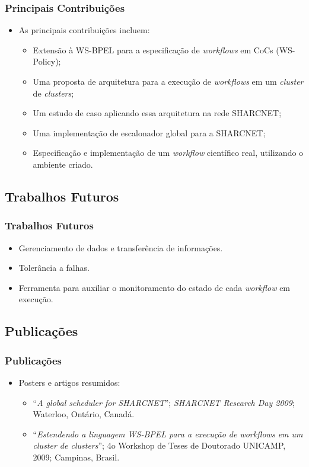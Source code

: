 \documentclass[red, cover=invisible, theme=Warsaw]{myslides}
\begin{document}
    
    \begin{frame} \frametitle{Principais Contribuições}
	\begin{itemize}
	    \item As principais contribuições incluem:
	    \begin{itemize}
		\item Extensão à WS-BPEL para a especificação de \textit{workflows} em CoCs (WS-Policy);
		\item Uma proposta de arquitetura para a execução de \textit{workflows} em um \textit{cluster} de \textit{clusters};
		\item Um estudo de caso aplicando essa arquitetura na rede SHARCNET;
		\item Uma implementação de escalonador global para a SHARCNET;
		\item Especificação e implementação de um \textit{workflow} científico real, utilizando o ambiente criado.
	    \end{itemize}
	\end{itemize}
    \end{frame}
    
    \subsection{Trabalhos Futuros}
    \begin{frame} \frametitle{Trabalhos Futuros}
	\begin{itemize}
    	    \item Gerenciamento de dados e transferência de informações.
    	    \item Tolerância a falhas.
	    \item Ferramenta para auxiliar o monitoramento do estado de cada \textit{workflow} em execução.
	\end{itemize}
    \end{frame}
    
    \subsection{Publicações}
    \begin{frame} \frametitle{Publicações}
	\begin{itemize}
	    \item Posters e artigos resumidos:
		\begin{itemize}
		    \item ``\textit{A global scheduler for SHARCNET}''; \textit{SHARCNET Research Day 2009}; Waterloo, Ontário, Canadá.
		    \item ``\textit{Estendendo a linguagem WS-BPEL para a execução de workflows em um cluster de clusters}''; 4o Workshop de Teses de Doutorado UNICAMP, 2009; Campinas, Brasil.
		\end{itemize}
	\end{itemize}
    \end{frame}
           
\end{document}
